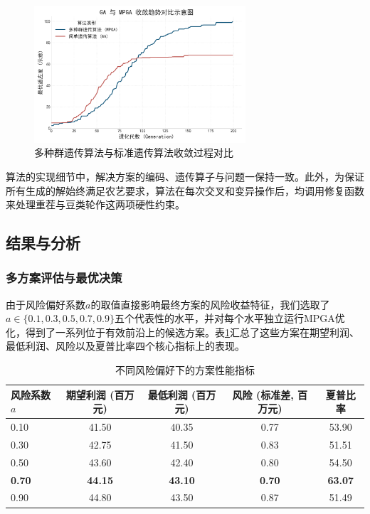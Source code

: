 \begin{figure}[H]
    \centering
    \includegraphics[width=0.7\textwidth]{figs/4问题二/遗传算法收敛对比图.png}

    \caption{多种群遗传算法与标准遗传算法收敛过程对比}
    \label{fig:convergence_comparison}
\end{figure}

算法的实现细节中，解决方案的编码、遗传算子与问题一保持一致。此外，为保证所有生成的解始终满足农艺要求，算法在每次交叉和变异操作后，均调用修复函数来处理重茬与豆类轮作这两项硬性约束。

\subsection{结果与分析}

\subsubsection{多方案评估与最优决策}
由于风险偏好系数$a$的取值直接影响最终方案的风险收益特征，我们选取了$a \in \{0.1, 0.3, 0.5, 0.7, 0.9\}$五个代表性的水平，并对每个水平独立运行MPGA优化，得到了一系列位于有效前沿上的候选方案。表\ref{tab:sensitivity_results}汇总了这些方案在期望利润、最低利润、风险以及夏普比率四个核心指标上的表现。

\begin{table}[H]
    \centering
    \caption{不同风险偏好下的方案性能指标}
    \label{tab:sensitivity_results}
    \begin{tabular}{@{}lcccc@{}}
        \toprule
        风险系数 $a$ & 期望利润 (百万元) & 最低利润 (百万元) & 风险 (标准差, 百万元) & 夏普比率 \\
        \midrule
        0.10 & 41.50 & 40.35 & 0.77 & 53.90 \\
        0.30 & 42.75 & 41.50 & 0.83 & 51.51 \\
        0.50 & 43.60 & 42.40 & 0.80 & 54.50 \\
        \textbf{0.70} & \textbf{44.15} & \textbf{43.10} & \textbf{0.70} & \textbf{63.07} \\
        0.90 & 44.80 & 43.50 & 0.87 & 51.49 \\
        \bottomrule
    \end{tabular}
\end{table}

